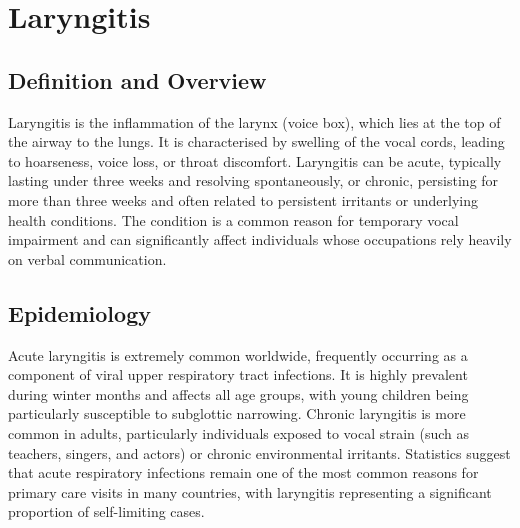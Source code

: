 \chapter{Laryngitis}

\section*{Definition and Overview}
Laryngitis is the inflammation of the larynx (voice box), which lies at the top of the airway to the lungs. It is characterised by swelling of the vocal cords, leading to hoarseness, voice loss, or throat discomfort. Laryngitis can be acute, typically lasting under three weeks and resolving spontaneously, or chronic, persisting for more than three weeks and often related to persistent irritants or underlying health conditions. The condition is a common reason for temporary vocal impairment and can significantly affect individuals whose occupations rely heavily on verbal communication.

\section*{Epidemiology}
Acute laryngitis is extremely common worldwide, frequently occurring as a component of viral upper respiratory tract infections. It is highly prevalent during winter months and affects all age groups, with young children being particularly susceptible to subglottic narrowing. Chronic laryngitis is more common in adults, particularly individuals exposed to vocal strain (such as teachers, singers, and actors) or chronic environmental irritants. Statistics suggest that acute respiratory infections remain one of the most common reasons for primary care visits in many countries, with laryngitis representing a significant proportion of self-limiting cases.

